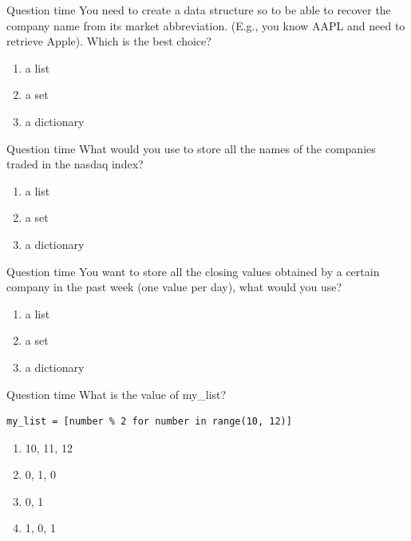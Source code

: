 \documentclass[aspectratio=169,]{beamer}
\begin{document}
\begin{frame}{Question time}
    You need to create a data structure so to be able to recover the company name from its market abbreviation.
    (E.g., you know AAPL and need to retrieve Apple).
    Which is the best choice?
    \begin{enumerate}
            \item a list
            \item a set
            \item a dictionary
    \end{enumerate}
\end{frame}

\begin{frame}{Question time}
    What would you use to store all the names of the companies traded in the nasdaq index?
    \begin{enumerate}
            \item a list
            \item a set
            \item a dictionary
    \end{enumerate}
\end{frame}

\begin{frame}{Question time}
    You want to store all the closing values obtained by a certain company in the past week (one value per day), what
    would you use?
    \begin{enumerate}
            \item a list
            \item a set
            \item a dictionary
    \end{enumerate}
\end{frame}

\begin{frame}[fragile]{Question time}
    What is the value of my\_list?
    \begin{verbatim}
my_list = [number % 2 for number in range(10, 12)]
    \end{verbatim}
    \begin{enumerate}
        \item  10, 11, 12
        \item  0, 1, 0
        \item  0, 1
        \item  1, 0, 1
    \end{enumerate}
\end{frame}
\end{document}
